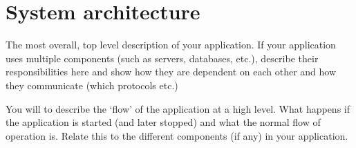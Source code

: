 \section{System architecture}

The most overall, top level description of your application. If your application
uses multiple components (such as servers, databases, etc.), describe their
responsibilities here and show how they are dependent on each other and how they
communicate (which protocols etc.)

You will to describe the `flow' of the application at a high level. What happens
if the application is started (and later stopped) and what the normal flow of
operation is. Relate this to the different components (if any) in your
application.